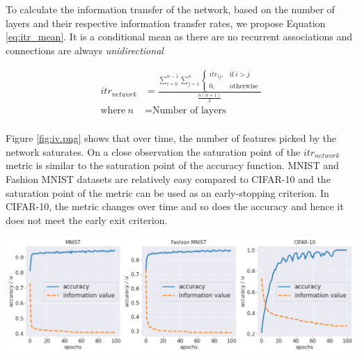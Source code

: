 \documentclass{article}
\begin{document}
To calculate the information transfer of the network, based on the number of layers and their respective information transfer rates, we propose Equation \ref{eq:itr_mean}.  It is a conditional mean as there are no recurrent associations and connections are always \emph{unidirectional}

\begin{equation}
\label{eq:itr_mean}
\begin{aligned}
itr_{network} &= \frac{\sum_{i=0}^{n-1}\sum_{j=1}^{n} 
\begin{cases}
  itr_{ij}, & \text{if}\ i>j \\
  0, & \text{otherwise}
\end{cases}}{\frac{n(n+1)}{2}}\\
\text{where}~n &= \text{Number of layers} \\
\end{aligned}
\end{equation}


\begin{minipage}{.4\textwidth}
Figure \ref{fig:iv.png} shows that over time, the number of features picked by the network saturates. On a close observation the saturation point of the $itr_{network}$ metric is similar to the saturation point of the accuracy function. MNIST and Fashion MNIST datasets are relatively easy compared to CIFAR-10 and the saturation point of the metric can be used as an early-stopping criterion. In CIFAR-10, the metric changes over time and so does the accuracy and hence it does not meet the early exit criterion.
\end{minipage}
\begin{minipage}{.5\textwidth}
    \centering
    \includegraphics[scale=0.25]{paper/iv.png}
    \label{fig:iv.png}
\end{minipage}
\end{document}
